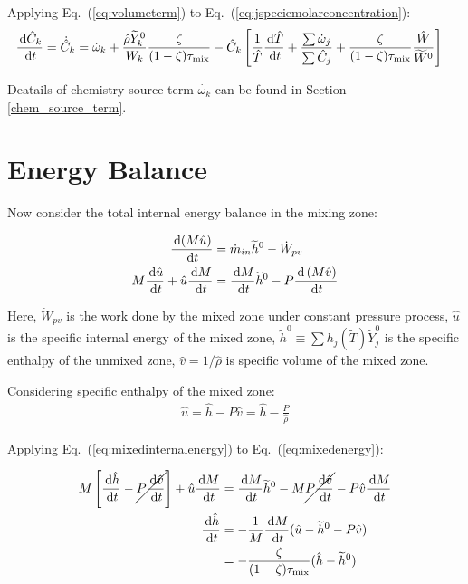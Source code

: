 Applying Eq.~(\ref{eq:volumeterm}) to Eq.~(\ref{eq:jspeciemolarconcentration}):
\begin{align} \label{eq:jspeciemolarconcentration2}
    \frac{\,\mathrm{d} {\hat{C}_{k}}}{\,\mathrm{d} t} &= \dot{\hat{C}}_k = \dot{\omega}_k +  \frac{\hat{\rho} \widetilde{Y}_k^0}{W_k} \frac{\zeta}{(1-\zeta) \tau_{\rm mix}} - \hat{C}_{k} \left[ \frac{1}{\hat{T}} \frac{\,\mathrm{d} \hat{T}}{\,\mathrm{d} t} + \frac{\sum{\dot{\omega}_j}}{\sum{\hat{C}_j}}+\frac{\zeta}{(1-\zeta)\tau_{\rm mix}}\frac{\hat{W}}{\widetilde{W}^0} \right]
\end{align}

Deatails of chemistry source term $\dot{{\omega}_k}$ can be found in Section \ref{chem_source_term}.

\section{Energy Balance}
\label{energy_balance_mixing_chem}

Now consider the total internal energy balance in the mixing zone:

\begin{align} \label{eq:mixedenergy}
    \frac{\,\mathrm{d} (M \hat{u}) }{\,\mathrm{d} t} &= \dot{m}_{in} \widetilde{h}^0 - \dot{W}_{pv} \\
    M \frac{\,\mathrm{d}  \hat{u} }{\,\mathrm{d} t} + \hat{u}\frac{\,\mathrm{d}  M }{\,\mathrm{d} t} &= \frac{\,\mathrm{d}  M }{\,\mathrm{d} t} \widetilde{h}^0 - P \frac{\,\mathrm{d} \left(M \hat{v} \right)}{\,\mathrm{d} t}
\end{align}

Here, $\dot{W}_{pv}$ is the work done by the mixed zone under constant pressure process, $\hat{u}$ is the specific internal energy of the mixed zone, $\widetilde{h}^0 \equiv \sum h_j(\widetilde{T}) \widetilde{Y}_j^0$ is the specific enthalpy of the unmixed zone, $\hat{v} = 1/\hat{\rho}$ is specific volume of the mixed zone.

Considering specific enthalpy of the mixed zone:
\begin{align} \label{eq:mixedinternalenergy}
    \hat{u}=\hat{h} - P\hat{v} = \hat{h} - \frac{P}{\hat{\rho}}
\end{align}


Applying Eq.~(\ref{eq:mixedinternalenergy}) to Eq.~(\ref{eq:mixedenergy}):

\begin{align} \label{eq:mixedenergy2}
     M \left[\frac{\,\mathrm{d}  \hat{h} }{\,\mathrm{d} t} -\cancel{P \frac{\,\mathrm{d}  \hat{v} }{\,\mathrm{d} t}} \right] + \hat{u}\frac{\,\mathrm{d}  M }{\,\mathrm{d} t} &= \frac{\,\mathrm{d}  M }{\,\mathrm{d} t} \widetilde{h}^0 - M \cancel{P \frac{\,\mathrm{d}  \hat{v} }{\,\mathrm{d} t}} - P \hat{v} \frac{\,\mathrm{d}  M }{\,\mathrm{d} t}\\
    \frac{\,\mathrm{d}  \hat{h} }{\,\mathrm{d} t} &= -\frac{1}{M} \frac{\,\mathrm{d}  M }{\,\mathrm{d} t} (\hat{u} -\widetilde{h}^0 - P \hat{v}) \\
    &= -\frac{\zeta}{(1-\zeta) \tau_{\rm mix}} (\hat{h} - \widetilde{h}^0)
\end{align}

